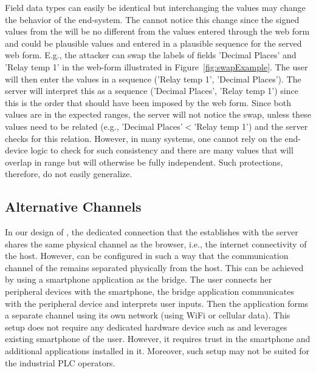  Field data types can easily be identical but interchanging the values may change the behavior of the end-system. The \server cannot notice this change since the signed values from the \device will be no different from the values entered through the web form and could be plausible values and entered in a plausible sequence for the served web form. E.g., the attacker can swap the labels of fields 'Decimal Places' and 'Relay temp 1' in the web-form illustrated in Figure~\ref{fig:swapExample}. The user will then enter the values in a sequence ('Relay temp 1', 'Decimal Places'). The server will interpret this as a sequence ('Decimal Places', 'Relay temp 1') since this is the order that should have been imposed by the web form. Since both values are in the expected ranges, the server will not notice the swap, unless these values need to be related (e.g., 'Decimal Places'$<$'Relay temp 1') and the server checks for this relation. However, in many systems, one cannot rely on the end-device logic to check for such consistency and there are many values that will overlap in range but will otherwise be fully independent. Such protections, therefore, do not easily generalize.


\subsection{Alternative Channels} 
\label{sec:systemDesign:alternativeChannel}
In our design of \tool, the dedicated connection that the \device establishes with the server shares the same physical channel as the browser, i.e., the internet connectivity of the host. However, \tool can be configured in such a way that the communication channel of the \device remains separated physically from the host. This can be achieved by using a smartphone application as the \tool bridge. The user connects her peripheral devices with the smartphone, the \tool bridge application communicates with the \usb peripheral device and interprets user inputs. Then the application forms a separate \tls channel using its own network (using WiFi or cellular data). This setup does not require any dedicated hardware device such as \device and leverages existing smartphone of the user. However, it requires trust in the smartphone and additional applications installed in it. Moreover, such setup may not be suited for the industrial PLC operators.


